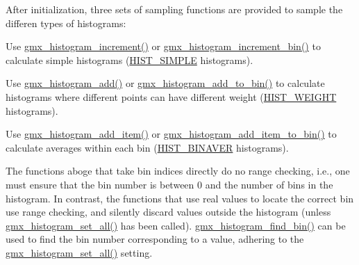 \-After initialization, three sets of sampling functions are provided to sample the differen types of histograms\-:
\begin{DoxyItemize}
\item \-Use \hyperlink{include_2histogram_8h_abbbe79464f40f6bd54ac16a9835b2722}{gmx\-\_\-histogram\-\_\-increment()} or \hyperlink{include_2histogram_8h_a457f6c58e1bd221ce1df64166abbfd0a}{gmx\-\_\-histogram\-\_\-increment\-\_\-bin()} to calculate simple histograms (\hyperlink{share_2template_2gromacs_2histogram_8h_ae733abe5734389e4450335504bde8d0ca407ff02856941647f344d41b61ef301f}{\-H\-I\-S\-T\-\_\-\-S\-I\-M\-P\-L\-E} histograms).
\item \-Use \hyperlink{include_2histogram_8h_ab7b820270fa5ac5525bc48c497ec78b5}{gmx\-\_\-histogram\-\_\-add()} or \hyperlink{include_2histogram_8h_a07a59d751592617c279ebbfc5f6da9b2}{gmx\-\_\-histogram\-\_\-add\-\_\-to\-\_\-bin()} to calculate histograms where different points can have different weight (\hyperlink{share_2template_2gromacs_2histogram_8h_ae733abe5734389e4450335504bde8d0ca54f44903504f2d44f5f66fcc28060ac4}{\-H\-I\-S\-T\-\_\-\-W\-E\-I\-G\-H\-T} histograms).
\item \-Use \hyperlink{include_2histogram_8h_a29f91ac2ad05731b7c6077e16dbfbad3}{gmx\-\_\-histogram\-\_\-add\-\_\-item()} or \hyperlink{include_2histogram_8h_a200fb89cb070efb95e2467d6e90cc2e5}{gmx\-\_\-histogram\-\_\-add\-\_\-item\-\_\-to\-\_\-bin()} to calculate averages within each bin (\hyperlink{share_2template_2gromacs_2histogram_8h_ae733abe5734389e4450335504bde8d0ca853ac4534a02fcfb29320cd70f903e2a}{\-H\-I\-S\-T\-\_\-\-B\-I\-N\-A\-V\-E\-R} histograms).
\end{DoxyItemize}

\-The functions aboge that take bin indices directly do no range checking, i.\-e., one must ensure that the bin number is between 0 and the number of bins in the histogram. \-In contrast, the functions that use real values to locate the correct bin use range checking, and silently discard values outside the histogram (unless \hyperlink{include_2histogram_8h_afadb5475f53de1db1941b233ad58ae1e}{gmx\-\_\-histogram\-\_\-set\-\_\-all()} has been called). \hyperlink{include_2histogram_8h_ab537ee679149545eb6d386c6c9cc7376}{gmx\-\_\-histogram\-\_\-find\-\_\-bin()} can be used to find the bin number corresponding to a value, adhering to the \hyperlink{include_2histogram_8h_afadb5475f53de1db1941b233ad58ae1e}{gmx\-\_\-histogram\-\_\-set\-\_\-all()} setting.

